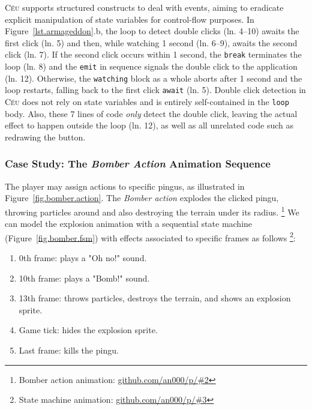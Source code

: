 \documentclass{vgtc}                          %
\newcommand{\CEU}{\textsc{C\'{e}u}\xspace}
\newcommand{\code}[1] {{\small{\texttt{#1}}}}
\begin{document}
\CEU supports structured constructs to deal with events, aiming to eradicate
explicit manipulation of state variables for control-flow purposes.
%
In Figure~\ref{lst.armageddon}.b, the loop to detect double clicks (ln. 4--10)
awaits the first click (ln. 5) and then, while watching 1 second (ln. 6--9),
awaits the second click (ln. 7).
If the second click occurs within 1 second, the \code{break} terminates the
loop (ln. 8) and the \code{emit} in sequence signals the double click to the
application (ln. 12).
Otherwise, the \code{watching} block as a whole aborts after 1 second  and the
loop restarts, falling back to the first click \code{await} (ln. 5).
%
Double click detection in \CEU does not rely on state variables and is entirely
self-contained in the \code{loop} body.
Also, these 7 lines of code \emph{only} detect the double click, leaving the
actual effect to happen outside the loop (ln. 12), as well as all unrelated
code such as redrawing the button.

\subsubsection{Case Study: The \emph{Bomber Action} Animation Sequence}
\label{sec.pats.fsms.2}

The player may assign actions to specific pingus, as illustrated in
Figure~\ref{fig.bomber.action}.
%
The \emph{Bomber action} explodes the clicked pingu, throwing particles around
and also destroying the terrain under its radius.%
\footnote{Bomber action animation: \url{github.com/an000/p/#2} }
%
We can model the explosion animation with a sequential state machine
(Figure~\ref{fig.bomber.fsm}) with effects associated to specific frames as
follows%
\footnote{State machine animation: \url{github.com/an000/p/#3} }:
%
\begin{enumerate}
\item 0th frame:  plays a "Oh no!" sound.
\item 10th frame: plays a "Bomb!" sound.
\item 13th frame: throws particles, destroys the terrain, and shows an
                  explosion sprite.
\item Game tick:  hides the explosion sprite.
\item Last frame: kills the pingu.
\end{enumerate}

\end{document}
